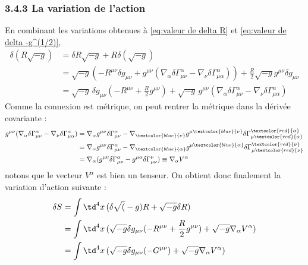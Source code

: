 \subsubsection{3.4.3 La variation de l'action}
En combinant les variations obtenues à \ref{eq:valeur de delta R} et \ref{eq:valeur de delta -g^(1/2)},
\begin{align}
    \delta(R\sqrt{-g}) &= \delta R\sqrt{-g} + R\delta(\sqrt{-g})\\
    &= \sqrt{-g}( -R^{\mu \nu}\delta g_{\mu \nu} + g^{\mu \nu}(\nabla_{\alpha}\delta\Gamma^{\alpha}_{\mu \nu} - \nabla_{\nu} \delta \Gamma^{\alpha}_{\mu \alpha})) +\frac{R}{2}\sqrt{-g}g^{\mu \nu}\delta g_{\mu \nu}\\
    &= \sqrt{-g} \, \delta g_{\mu \nu}( -R^{\mu \nu} + \frac{R}{2}g^{\mu \nu}) + \sqrt{-g} \, g^{\mu \nu}(\nabla_{\alpha}\delta\Gamma^{\alpha}_{\mu \nu} - \nabla_{\nu} \delta \Gamma^{\alpha}_{\mu \alpha})
    \label{eq:valeur delta(R(-g)^1/2)}
\end{align}
Comme la connexion est métrique, on peut rentrer la métrique dans la dérivée covariante :
\begin{align}
    g^{\mu \nu}(\nabla_{\alpha}\delta\Gamma^{\alpha}_{\mu \nu} - \nabla_{\nu} \delta \Gamma^{\alpha}_{\mu \alpha}) &= \nabla_{\alpha} g^{\mu \nu} \delta\Gamma^{\alpha}_{\mu \nu} - \nabla_{\textcolor{blue}{\nu}} g^{\mu \textcolor{blue}{\nu}} \delta \Gamma^{\textcolor{red}{\alpha}}_{\mu \textcolor{red}{\alpha}}\\
    &= \nabla_{\alpha} g^{\mu \nu} \delta\Gamma^{\alpha}_{\mu \nu} - \nabla_{\textcolor{blue}{\alpha}} g^{\mu \textcolor{blue}{\alpha}} \delta \Gamma^{\textcolor{red}{\nu}}_{\mu \textcolor{red}{\nu}}\\
    &= \nabla_{\alpha}(g^{\mu \nu} \delta\Gamma^{\alpha}_{\mu \nu} -g^{\mu \alpha} \delta \Gamma^{\nu}_{\mu \nu}) \equiv \nabla_{\alpha} V^{\alpha}
\end{align}
notons que le vecteur $V^\alpha$ est bien un tenseur. On obtient donc finalement la variation d'action suivante :
\begin{align}
    \delta S &= \int \td ^4x\, (\delta \sqrt(-g)R + \sqrt{-g}\delta R)\\
    &= \int \td ^4x \, (\sqrt{-g}\delta g_{\mu \nu}( -R^{\mu \nu} +\frac{R}{2}g^{\mu \nu}) + \sqrt{-g}\nabla_{\alpha} V^{\alpha})\\
    &= \int \td ^4x \, (\sqrt{-g}\delta g_{\mu \nu}( -G^{\mu \nu})+ \sqrt{-g}\nabla_{\alpha} V^{\alpha})\\
\end{align}

